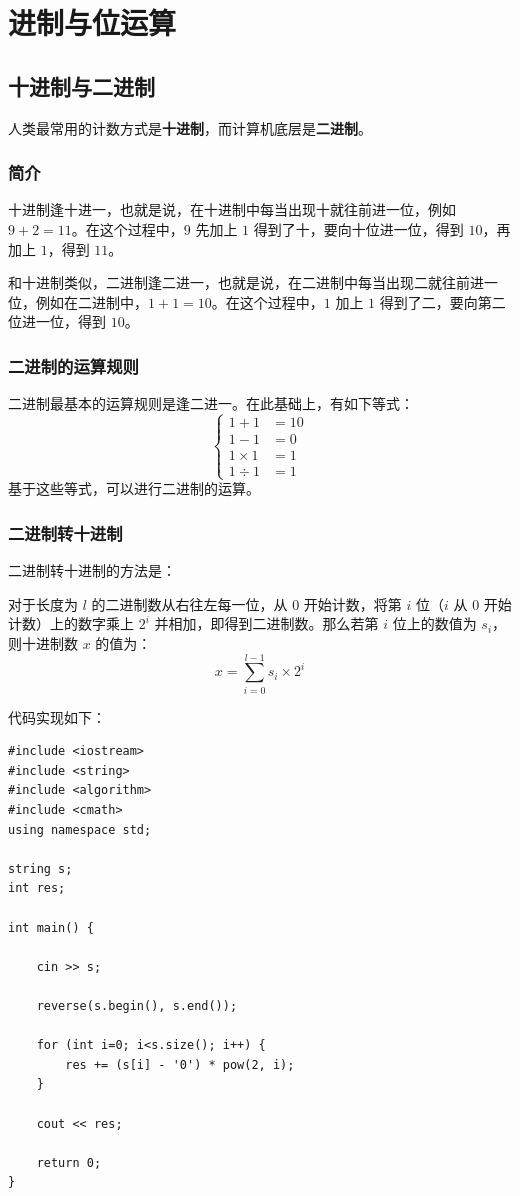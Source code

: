 \chapter{进制与位运算}

\section{十进制与二进制}

人类最常用的计数方式是\textbf{十进制}，而计算机底层是\textbf{二进制}。

\subsection{简介}

十进制逢十进一，也就是说，在十进制中每当出现十就往前进一位，例如 $9 + 2 = 11$。在这个过程中，$9$ 先加上 $1$ 得到了十，要向十位进一位，得到 $10$，再加上 $1$，得到 $11$。

和十进制类似，二进制逢二进一，也就是说，在二进制中每当出现二就往前进一位，例如在二进制中，$1 + 1 = 10$。在这个过程中，$1$ 加上 $1$ 得到了二，要向第二位进一位，得到 $10$。

\subsection{二进制的运算规则}

二进制最基本的运算规则是逢二进一。在此基础上，有如下等式：
\[
\begin{cases}
1 + 1 &= 10\\
1 - 1 &= 0\\
1 \times 1 &= 1\\
1 \div 1 &= 1
\end{cases}
\]
基于这些等式，可以进行二进制的运算。

\subsection{二进制转十进制}

二进制转十进制的方法是：

对于长度为 $l$ 的二进制数从右往左每一位，从 $0$ 开始计数，将第 $i$ 位（$i$ 从 $0$ 开始计数）上的数字乘上 $2^i$ 并相加，即得到二进制数。那么若第 $i$ 位上的数值为 $s_i$，则十进制数 $x$ 的值为：
\[
x = \sum\limits_{i=0}^{l-1} s_i \times 2^i
\]

代码实现如下：

\begin{lstlisting}[caption=二进制转十进制]
#include <iostream>
#include <string>
#include <algorithm>
#include <cmath>
using namespace std;

string s;
int res;

int main() {
	
	cin >> s;
	
	reverse(s.begin(), s.end());
	
	for (int i=0; i<s.size(); i++) {
		res += (s[i] - '0') * pow(2, i);
	}
	
	cout << res;
	
	return 0;
}
\end{lstlisting}

